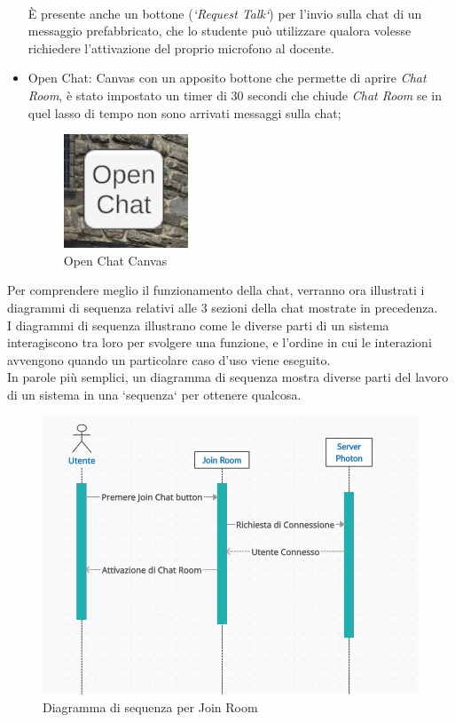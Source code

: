 \begin{itemize}
    \\È presente anche un bottone (\textit{`Request Talk`}) per l'invio sulla chat di un messaggio prefabbricato, che lo studente può utilizzare qualora volesse richiedere l'attivazione del proprio microfono al docente. 
    \item Open Chat: Canvas con un apposito bottone che permette di aprire \textit{Chat Room}, è stato impostato un timer di 30 secondi che chiude \textit{Chat Room} se in quel lasso di tempo non sono arrivati messaggi sulla chat;
    \begin{figure}[H]
    \centering
    \includegraphics[scale = 0.65]{Immagini/Openchat.jpg}
    \caption{Open Chat Canvas}
    \label{fig:my_label}
\end{figure}
\end{itemize}
Per comprendere meglio il funzionamento della chat, verranno ora illustrati i diagrammi di sequenza relativi alle 3 sezioni della chat mostrate in precedenza.
\\I diagrammi di sequenza illustrano come le diverse parti di un sistema interagiscono tra loro per svolgere una funzione, e l'ordine in cui le interazioni avvengono quando un particolare caso d'uso viene eseguito.
\\In parole più semplici, un diagramma di sequenza mostra diverse parti del lavoro di un sistema in una `sequenza` per ottenere qualcosa.
\begin{figure}[H]
    \centering
    \includegraphics[scale = 0.65]{Immagini/ChatBackgrounddiagramma.jpg}
    \caption{Diagramma di sequenza per Join Room}
    \label{fig:my_label}
    \end{figure}
